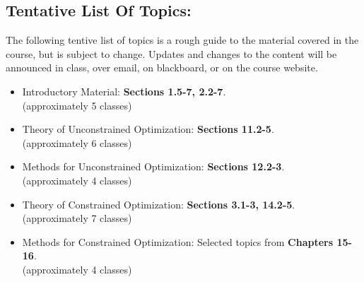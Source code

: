 \documentclass[margin]{res}
\theoremstyle{plain}
\theoremstyle{definition}
\theoremstyle{remark}
\begin{document}
\begin{resume}

\section{Tentative List Of Topics:} The following tentive list of topics is a rough guide to the material covered in the course, but is subject to change. Updates and changes to the content will be announced in class, over email, on blackboard, or on the course website.


\begin{itemize}
\item 
Introductory Material: \textbf{Sections 1.5-7, 2.2-7}. \\(approximately 5 classes)
\item 
Theory of Unconstrained Optimization: \textbf{Sections 11.2-5}. \\(approximately 6 classes)
\item 
Methods for Unconstrained Optimization: \textbf{Sections 12.2-3}. \\(approximately 4 classes)
\item 
Theory of Constrained Optimization: \textbf{Sections 3.1-3, 14.2-5}. \\(approximately 7 classes)
\item 
Methods for Constrained Optimization: Selected topics from \textbf{Chapters 15-16}. \\(approximately 4 classes)
\end{itemize}


\end{resume}
\end{document}
